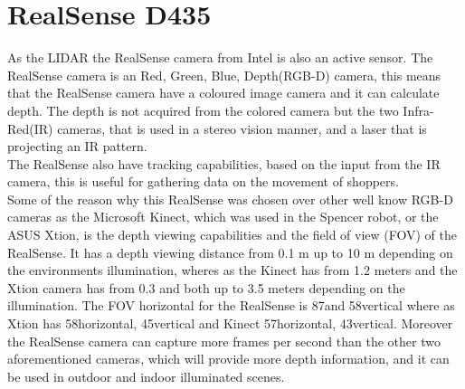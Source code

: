 \section{RealSense D435}

As the LIDAR the RealSense camera from Intel is also an active sensor. The RealSense camera is an Red, Green, Blue, Depth(RGB-D) camera, this means that the RealSense camera have a coloured image camera and it can calculate depth. The depth is not acquired from the colored camera but the two Infra-Red(IR) cameras, that is used in a stereo vision manner, and a laser that is projecting an IR pattern.\cite{RealSense}\\
The RealSense also have tracking capabilities, based on the input from the IR camera, this is useful for gathering data on the movement of shoppers.\cite{RealSense}\\
Some of the reason why this RealSense was chosen over other
well know RGB-D cameras as the Microsoft Kinect, which was used in the Spencer robot, or the ASUS Xtion, is the depth viewing capabilities and the field of view (FOV) of the RealSense. It has a depth viewing distance from 0.1 m up to 10 m depending on the environments illumination\cite{RealSense}, wheres as the Kinect has from 1.2 meters and the Xtion camera has from 0.3 and both up to 3.5 meters\cite{Xtion}\cite{Kinect} depending on the illumination. The FOV horizontal for the RealSense is 87\degree and 58\degree vertical where as Xtion has 58\degree horizontal, 45\degree vertical\cite{Xtion} and Kinect 57\degree horizontal, 43\degree vertical\cite{Kinect}. Moreover the RealSense camera can capture more frames per second than the other two aforementioned cameras, which will provide more depth information, and it can be used in outdoor and indoor illuminated scenes.\cite{RealSense} \\